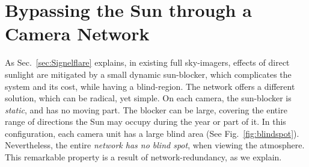 \documentclass[runningheads]{llncs}
\begin{document}
\section{Bypassing the Sun through a Camera Network}
\label{sec:mutiSun}

As Sec.~\ref{sec:Signelflare} explains, in existing full sky-imagers, effects of direct sunlight are mitigated by a small dynamic sun-blocker, which complicates the system and its cost, while having a blind-region. The network offers a different solution, which can be radical, yet simple. On each camera, the sun-blocker is {\em static}, and has no moving part. The blocker can be large, covering the entire range of directions the Sun may occupy during the year or part of it. In this configuration, each camera unit has a large blind area (See Fig.~\ref{fig:blindspot}). Nevertheless, the entire {\em network has no blind spot}, when viewing the atmosphere. This remarkable property is a result of network-redundancy, as we explain.
\end{document}
